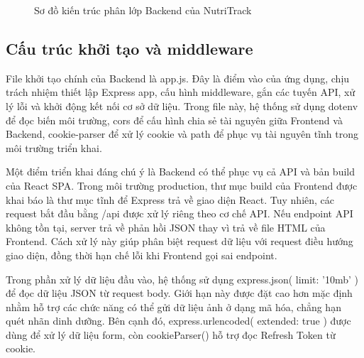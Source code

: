 \documentclass[12pt, a4paper]{report}
\begin{document}
\begin{figure}[htbp]
{
    }%
    \caption{Sơ đồ kiến trúc phân lớp Backend của NutriTrack}
    \label{fig:backend_architecture}
\end{figure}

\subsection{Cấu trúc khởi tạo và middleware}File khởi tạo chính của Backend là app.js. Đây là điểm vào của ứng dụng, chịu trách nhiệm thiết lập Express app, cấu hình middleware, gắn các tuyến API, xử lý lỗi và khởi động kết nối cơ sở dữ liệu. Trong file này, hệ thống sử dụng dotenv để đọc biến môi trường, cors để cấu hình chia sẻ tài nguyên giữa Frontend và Backend, cookie-parser để xử lý cookie và path để phục vụ tài nguyên tĩnh trong môi trường triển khai.

Một điểm triển khai đáng chú ý là Backend có thể phục vụ cả API và bản build của React SPA. Trong môi trường production, thư mục build của Frontend được khai báo là thư mục tĩnh để Express trả về giao diện React. Tuy nhiên, các request bắt đầu bằng /api được xử lý riêng theo cơ chế API. Nếu endpoint API không tồn tại, server trả về phản hồi JSON thay vì trả về file HTML của Frontend. Cách xử lý này giúp phân biệt request dữ liệu với request điều hướng giao diện, đồng thời hạn chế lỗi khi Frontend gọi sai endpoint.

Trong phần xử lý dữ liệu đầu vào, hệ thống sử dụng express.json({ limit: '10mb' }) để đọc dữ liệu JSON từ request body. Giới hạn này được đặt cao hơn mặc định nhằm hỗ trợ các chức năng có thể gửi dữ liệu ảnh ở dạng mã hóa, chẳng hạn quét nhãn dinh dưỡng. Bên cạnh đó, express.urlencoded({ extended: true }) được dùng để xử lý dữ liệu form, còn cookieParser() hỗ trợ đọc Refresh Token từ cookie.
\end{document}
